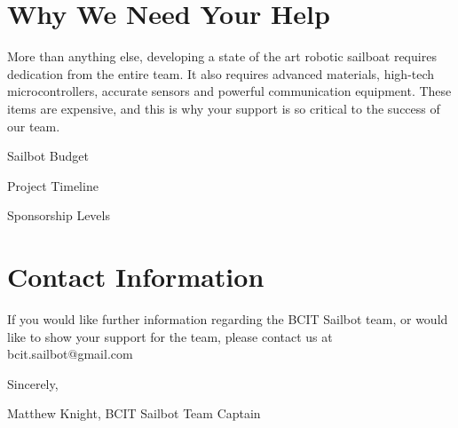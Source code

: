 \documentclass{article}
\begin{document}
\section*{Why We Need Your Help}

More than anything else, developing a state of the art robotic sailboat requires 
dedication from the entire team. It also requires advanced materials, high-tech 
microcontrollers, accurate sensors and powerful communication equipment. These 
items are expensive, and this is why your support is so critical to the success 
of our team.

Sailbot Budget

Project Timeline 

Sponsorship Levels 

\section*{Contact Information}
If you would like further information regarding the BCIT Sailbot team, or
would like to show your support for the team, please contact us at
bcit.sailbot@gmail.com


Sincerely,

Matthew Knight,
BCIT Sailbot Team Captain
\end{document}
